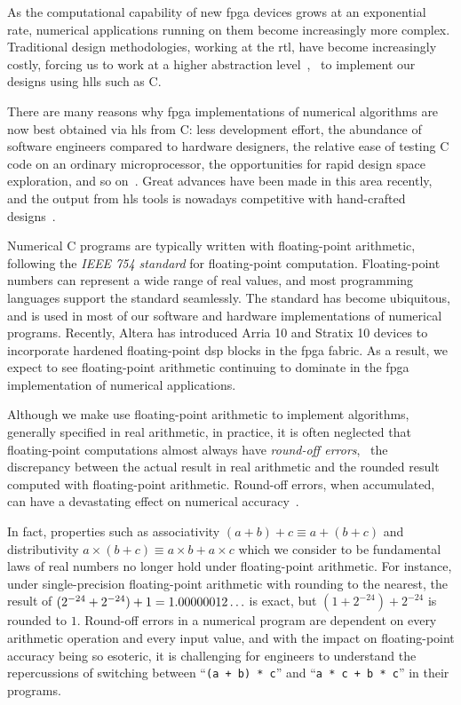 As the computational capability of new \gls{fpga} devices grows at an
exponential rate, numerical applications running on them become increasingly
more complex.  Traditional design methodologies, working at the \gls{rtl},
have become increasingly costly, forcing us to work at a higher abstraction
level~\cite{gajski}, \eg~to implement our designs using \glspl{hll} such as
C\@.

There are many reasons why \gls{fpga} implementations of numerical algorithms
are now best obtained via \gls{hls} from C\@: less development effort, the
abundance of software engineers compared to hardware designers, the relative
ease of testing C code on an ordinary microprocessor, the opportunities for
rapid design space exploration, and so on~\cite{meeus12}. Great advances
have been made in this area recently, and the output from \gls{hls} tools is
nowadays competitive with hand-crafted designs~\cite{bdti_xilinx}.

Numerical C programs are typically written with floating-point arithmetic,
following the \emph{IEEE 754 standard} for floating-point computation.
Floating-point numbers can represent a wide range of real values, and
most programming languages support the standard seamlessly.  The standard
has become ubiquitous, and is used in most of our software and hardware
implementations of numerical programs.  Recently, Altera has introduced Arria
10 and Stratix 10 devices to incorporate hardened floating-point \gls{dsp}
blocks in the \gls{fpga} fabric.  As a result, we expect to see floating-point
arithmetic continuing to dominate in the \gls{fpga} implementation of numerical
applications.

Although we make use floating-point arithmetic to implement algorithms,
generally specified in real arithmetic, in practice, it is often neglected that
floating-point computations almost always have \emph{round-off errors}, \ie~the
discrepancy between the actual result in real arithmetic and the rounded result
computed with floating-point arithmetic.  Round-off errors, when accumulated,
can have a devastating effect on numerical accuracy~\cite{higham02}.

In fact, properties such as associativity $(a + b) + c \equiv a + (b + c)$
and distributivity $a \times (b + c) \equiv a \times b + a \times c$ which
we consider to be fundamental laws of real numbers no longer hold under
floating-point arithmetic.  For instance, under single-precision floating-point
arithmetic with rounding to the nearest, the result of $(2^{-24} + 2^{-24})
+ 1 = 1.00000012\mathellipsis$ is exact, but $(1 + 2^{-24}) + 2^{-24}$ is
rounded to $1$.  Round-off errors in a numerical program are dependent on
every arithmetic operation and every input value, and with the impact on
floating-point accuracy being so esoteric, it is challenging for engineers to
understand the repercussions of switching between ``\verb|(a + b) * c|'' and
``\verb|a * c + b * c|'' in their programs.

